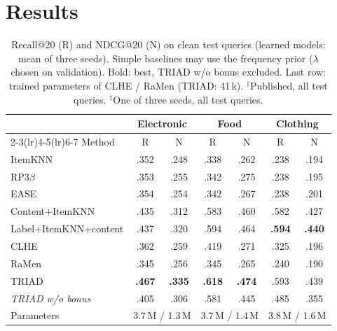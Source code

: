 \documentclass[runningheads]{llncs}
\begin{document}
\section{Results}

\begin{table}[t]
\centering
\caption{Recall@20 (R) and NDCG@20 (N) on clean test queries (learned models: mean of three seeds). Simple baselines may
use the frequency prior ($\lambda$ chosen on validation). Bold: best, TRIAD w/o bonus excluded. Last row: trained
parameters of CLHE / RaMen (TRIAD: 41\,k). $^\dagger$Published, all test queries. $^\ddagger$One of three seeds, all
test queries.}
\label{tab:main}
\setlength{\tabcolsep}{3.2pt}
\scriptsize
\begin{tabular}{lcccccc}
\toprule
 & \multicolumn{2}{c}{Electronic} & \multicolumn{2}{c}{Food} & \multicolumn{2}{c}{Clothing}\\
\cmidrule(lr){2-3}\cmidrule(lr){4-5}\cmidrule(lr){6-7}
Method & R & N & R & N & R & N\\
\midrule
ItemKNN & .352 & .248 & .338 & .262 & .238 & .194\\
RP3$\beta$ & .353 & .255 & .342 & .275 & .238 & .195\\
EASE & .354 & .254 & .342 & .267 & .238 & .201\\
Content+ItemKNN & .435 & .312 & .583 & .460 & .582 & .427\\
Label+ItemKNN+content & .437 & .320 & .594 & .464 & \textbf{.594} & \textbf{.440}\\
\midrule
CLHE & .362 & .259 & .419 & .271 & .325 & .196\\
RaMen & .345 & .256 & .345 & .265 & .240 & .190\\
\midrule
TRIAD & \textbf{.467} & \textbf{.335} & \textbf{.618} & \textbf{.474} & .593 & .439\\
\emph{TRIAD w/o bonus} & .405 & .306 & .581 & .445 & .485 & .355\\
\midrule
Parameters & \multicolumn{2}{c}{3.7\,M / 1.3\,M} & \multicolumn{2}{c}{3.7\,M / 1.4\,M} & \multicolumn{2}{c}{3.8\,M / 1.6\,M}\\
\bottomrule
\end{tabular}


\end{table}
\end{document}

